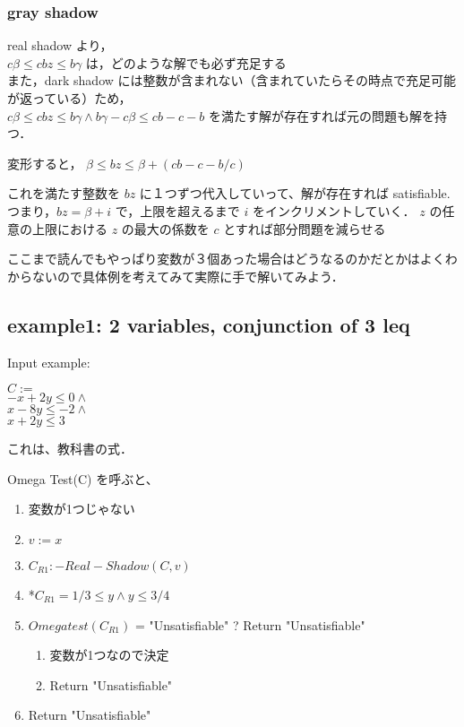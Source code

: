 \subsubsection*{gray shadow}
real shadow より，\\
$c\beta \leq cbz \leq b\gamma$ は，どのような解でも必ず充足する\\
また，dark shadow には整数が含まれない（含まれていたらその時点で充足可能が返っている）ため，\\
$c\beta \leq cbz\leq b\gamma \wedge b\gamma -c\beta \leq cb-c-b$ を満たす解が存在すれば元の問題も解を持つ．

変形すると，
$\beta \leq bz \leq \beta + (cb-c-b/c)$

これを満たす整数を $bz$ に１つずつ代入していって、解が存在すれば satisfiable.
つまり，$bz=\beta + i$ で，上限を超えるまで $i$ をインクリメントしていく．
$z$ の任意の上限における $z$ の最大の係数を $c$ とすれば部分問題を減らせる


ここまで読んでもやっぱり変数が３個あった場合はどうなるのかだとかはよくわからないので具体例を考えてみて実際に手で解いてみよう．


\subsection*{example1: 2 variables, conjunction of 3 leq}
Input example:
\begin{center}
    $C :=$\\
    $-x + 2y \leq 0 \wedge$\\
    $x -8y \leq -2 \wedge$\\
    $x + 2y \leq 3 $
\end{center}

これは、教科書の式．

Omega Test(C) を呼ぶと、
\begin{enumerate}
    \item 変数が1つじゃない
    \item $v := x$
    \item $C_{R1} :- Real-Shadow(C,v)$
    \item *$C_{R1} = 1/3 \leq y \wedge y \leq 3/4$
    \item $Omegatest(C_{R1})$ = "Unsatisfiable" ? Return "Unsatisfiable"
    \begin{enumerate}
        \item 変数が1つなので決定
        \item Return "Unsatisfiable"
    \end{enumerate}
    \item Return "Unsatisfiable"
\end{enumerate}


